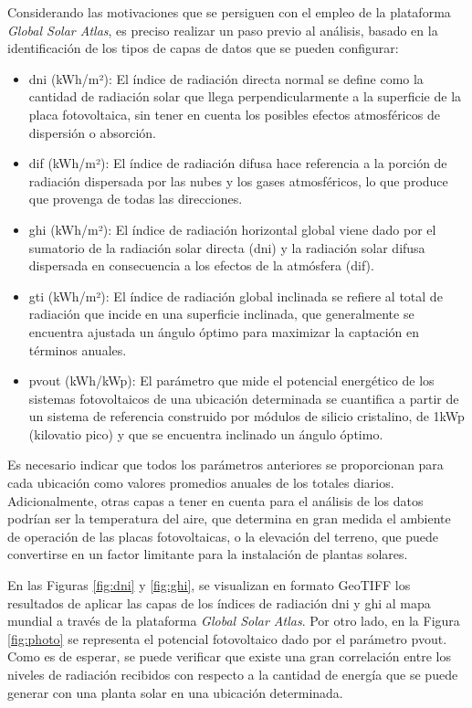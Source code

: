 Considerando las motivaciones que se persiguen con el empleo de la plataforma \textit{Global Solar Atlas}, es preciso realizar un paso previo al análisis, basado en la identificación de los tipos de capas de datos que se pueden configurar: \cite{globalsolarreport}

\begin{itemize}    
    \item \gls{dni} (kWh/m²): El índice de radiación directa normal se define como la cantidad de radiación solar que llega perpendicularmente a la superficie de la placa fotovoltaica, sin tener en cuenta los posibles efectos atmosféricos de dispersión o absorción.
    \item \gls{dif} (kWh/m²): El índice de radiación difusa hace referencia a la porción de radiación dispersada por las nubes y los gases atmosféricos, lo que produce que provenga de todas las direcciones.
    \item \gls{ghi} (kWh/m²): El índice de radiación horizontal global viene dado por el sumatorio de la radiación solar directa (\gls{dni}) y la radiación solar difusa dispersada en consecuencia a los efectos de la atmósfera (\gls{dif}).
    \item \gls{gti} (kWh/m²): El índice de radiación global inclinada se refiere al total de radiación que incide en una superficie inclinada, que generalmente se encuentra ajustada un ángulo óptimo para maximizar la captación en términos anuales. 
    \item \gls{pvout} (kWh/kWp): El parámetro que mide el potencial energético de los sistemas fotovoltaicos de una ubicación determinada se cuantifica a partir de un sistema de referencia construido por módulos de silicio cristalino, de 1kWp (kilovatio pico) y que se encuentra inclinado un ángulo óptimo.
\end{itemize}

Es necesario indicar que todos los parámetros anteriores se proporcionan para cada ubicación como valores promedios anuales de los totales diarios. Adicionalmente, otras capas a tener en cuenta para el análisis de los datos podrían ser la temperatura del aire, que determina en gran medida el ambiente de operación de las placas fotovoltaicas, o la elevación del terreno, que puede convertirse en un factor limitante para la instalación de plantas solares. 

\vspace{3mm}

En las Figuras \ref{fig:dni} y \ref{fig:ghi}, se visualizan en formato GeoTIFF los resultados de aplicar las capas de los índices de radiación \gls{dni} y \gls{ghi} al mapa mundial a través de la plataforma \textit{Global Solar Atlas}. Por otro lado, en la Figura \ref{fig:photo} se representa el potencial fotovoltaico dado por el parámetro \gls{pvout}. Como es de esperar, se puede verificar que existe una gran correlación entre los niveles de radiación recibidos con respecto a la cantidad de energía que se puede generar con una planta solar en una ubicación determinada. 

